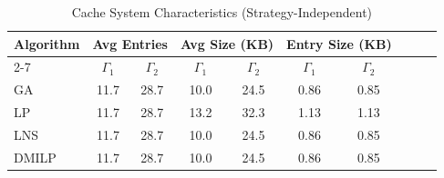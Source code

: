 \begin{table}[t]
\centering
\caption{Cache System Characteristics (Strategy-Independent)}
\label{tab:cache_characteristics}
\small
\begin{tabular}{p{1.5cm}c c c c c c c c c }
\toprule
\multirow{2}{*}{\textbf{Algorithm}} & \multicolumn{2}{c}{\textbf{Avg Entries }}  & \multicolumn{2}{c}{\textbf{Avg Size (KB)}} & \multicolumn{2}{c}{\textbf{Entry Size (KB)}}   \\
\cmidrule(lr){2-7} 
 & $\Gamma_1$ & $\Gamma_2$ & $\Gamma_1$ & $\Gamma_2$ & $\Gamma_1$ & $\Gamma_2$ \\ 
\midrule
    GA & 11.7 & 28.7 & 10.0 & 24.5 & 0.86 & 0.85  \\
LP & 11.7 & 28.7 & 13.2 & 32.3 & 1.13 & 1.13  \\
LNS & 11.7 & 28.7 & 10.0 & 24.5 & 0.86 & 0.85  \\
DMILP & 11.7 & 28.7 & 10.0 & 24.5 & 0.86 & 0.85  \\
\bottomrule
\end{tabular}

\end{table}
